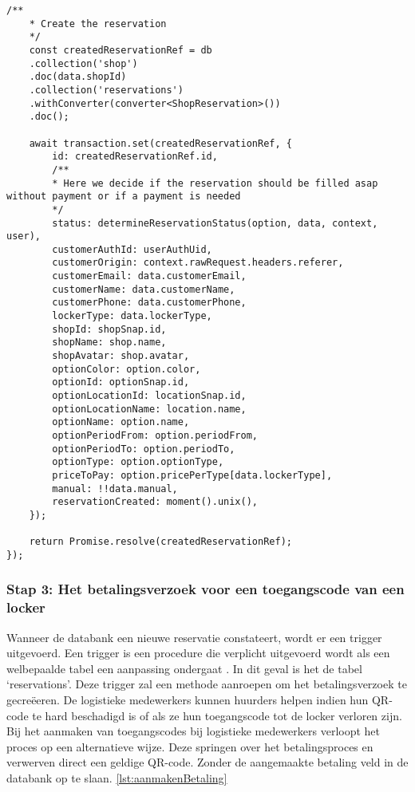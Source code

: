 \begin{lstlisting}[caption={De creatie van een reservatie voor het huren van een locker. Deze reservatie wordt bijgehouden in de databank}, label={lst:aanmakenReservatie}]
    /**
    * Create the reservation
    */
    const createdReservationRef = db
    .collection('shop')
    .doc(data.shopId)
    .collection('reservations')
    .withConverter(converter<ShopReservation>())
    .doc();
    
    await transaction.set(createdReservationRef, {
        id: createdReservationRef.id,
        /**
        * Here we decide if the reservation should be filled asap without payment or if a payment is needed
        */
        status: determineReservationStatus(option, data, context, user),
        customerAuthId: userAuthUid,
        customerOrigin: context.rawRequest.headers.referer,
        customerEmail: data.customerEmail,
        customerName: data.customerName,
        customerPhone: data.customerPhone,
        lockerType: data.lockerType,
        shopId: shopSnap.id,
        shopName: shop.name,
        shopAvatar: shop.avatar,
        optionColor: option.color,
        optionId: optionSnap.id,
        optionLocationId: locationSnap.id,
        optionLocationName: location.name,
        optionName: option.name,
        optionPeriodFrom: option.periodFrom,
        optionPeriodTo: option.periodTo,
        optionType: option.optionType,
        priceToPay: option.pricePerType[data.lockerType],
        manual: !!data.manual,
        reservationCreated: moment().unix(),
    });
    
    return Promise.resolve(createdReservationRef);
});
\end{lstlisting}

\subsubsection{Stap 3: Het betalingsverzoek voor een toegangscode van een locker}%
\label{sec:opbouwQR-codeVerkoop12}

Wanneer de databank een nieuwe reservatie constateert, wordt er een trigger uitgevoerd. Een trigger is een procedure die verplicht uitgevoerd wordt als een welbepaalde tabel een aanpassing ondergaat \autocite{documentation}. In dit geval is het de tabel ‘reservations’. Deze trigger zal een methode aanroepen om het betalingsverzoek te gecreëeren. 
De logistieke medewerkers kunnen huurders helpen indien hun QR-code te hard beschadigd is of als ze hun toegangscode tot de locker verloren zijn. Bij het aanmaken van toegangscodes bij logistieke medewerkers verloopt het proces op een alternatieve wijze.  Deze springen over het betalingsproces en verwerven direct een geldige QR-code. Zonder de aangemaakte betaling veld in de databank op te slaan.  \ref{lst:aanmakenBetaling}

